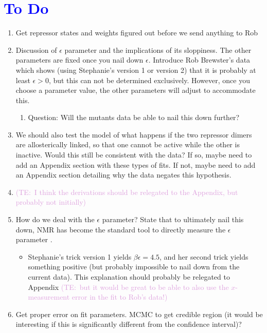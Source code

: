 \documentclass[10pt,letterpaper]{article}
\newcommand{\talComment}[1]{\textcolor{Plum}{(TE:~#1)}}
\begin{document}
\section*{\textcolor{blue}{To Do}}

\begin{enumerate}
	\item Get repressor states and weights figured out before we send anything to Rob
	
	\item Discussion of $\epsilon$ parameter and the implications of its sloppiness. The other parameters are fixed once you nail down $\epsilon$. Introduce Rob Brewster's data  which shows (using Stephanie's version 1 or version 2) that it is probably at least $\epsilon > 0$, but this can not be determined exclusively. However, once you choose a parameter value, the other parameters will adjust to accommodate this.
	\begin{enumerate}
		\item Question: Will the mutants data be able to nail this down further?
	\end{enumerate}
	
	\item We should also test the model of what happens if the two repressor dimers are allosterically linked, so that one cannot be active while the other is inactive. Would this still be consistent with the data? If so, maybe need to add an Appendix section with these types of fits. If not, maybe need to add an Appendix section detailing why the data negates this hypothesis.
	
	\item \talComment{I think the derivations should be relegated to the Appendix, but probably not initially}
	
	\item How do we deal with the $\epsilon$ parameter? State that to ultimately nail this down, NMR has become the standard tool to directly measure the $\epsilon$ parameter \cite{Gardino2003, Boulton2016}.
	\begin{itemize}
		\item Stephanie's trick version 1 yields $\beta \epsilon = 4.5$, and her second trick yields something positive (but probably impossible to nail down from the current data). This explanation should probably be relegated to Appendix \talComment{but it would be great to be able to also use the $x$-measurement error in the fit to Rob's data!}
	\end{itemize}
	
	\item Get proper error on fit parameters. MCMC to get credible region (it would be interesting if this is significantly different from the confidence interval)?
\end{enumerate}
\end{document}

